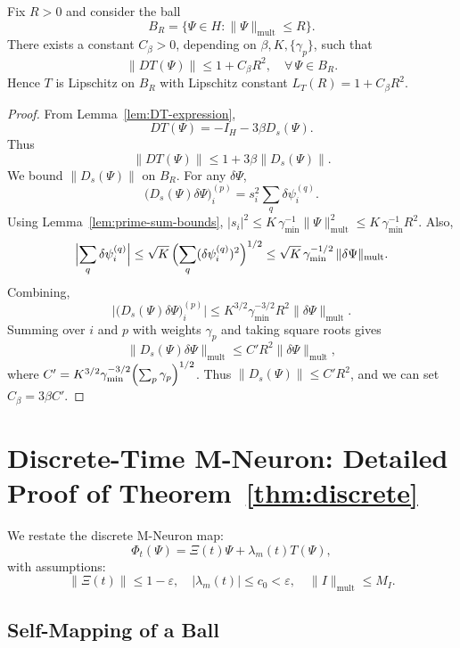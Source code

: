 \documentclass[11pt]{article}
\begin{document}
\begin{lemma}
\label{lem:T-Lipschitz}
Fix \(R>0\) and consider the ball
\[
B_R = \{\Psi\in H : \|\Psi\|_{\mathrm{mult}}\le R\}.
\]
There exists a constant \(C_\beta>0\), depending on \(\beta,K,\{\gamma_p\}\), such that
\begin{equation}
\label{eq:T-Lipschitz}
\|DT(\Psi)\| \le 1 + C_\beta R^2,
\quad
\forall\,\Psi\in B_R.
\end{equation}
Hence \(T\) is Lipschitz on \(B_R\) with Lipschitz constant
\(L_T(R) = 1 + C_\beta R^2\).
\end{lemma}

\begin{proof}
From Lemma~\ref{lem:DT-expression},
\[
DT(\Psi) = -I_H - 3\beta D_s(\Psi).
\]
Thus
\[
\|DT(\Psi)\| \le 1 + 3\beta \|D_s(\Psi)\|.
\]
We bound \(\|D_s(\Psi)\|\) on \(B_R\).
For any \(\delta\Psi\),
\[
\bigl(D_s(\Psi)\delta\Psi\bigr)_i^{(p)}
= s_i^2 \sum_{q} \delta\psi_i^{(q)}.
\]
Using Lemma~\ref{lem:prime-sum-bounds}, \(|s_i|^2 \le K\,\gamma_{\min}^{-1}\|\Psi\|_{\mathrm{mult}}^2 \le K\,\gamma_{\min}^{-1} R^2\).
Also,
\[
\Bigl|\sum_q \delta\psi_i^{(q)}\Bigr|
\le \sqrt{K}\,\Bigl(\sum_q (\delta\psi_i^{(q)})^2\Bigr)^{1/2}
\le \sqrt{K}\,\gamma_{\min}^{-1/2}\,\|\delta\Psi\|_{\mathrm{mult}}.
\]
Combining,
\[
\bigl|\bigl(D_s(\Psi)\delta\Psi\bigr)_i^{(p)}\bigr|
\le K^{3/2} \gamma_{\min}^{-3/2} R^2 \|\delta\Psi\|_{\mathrm{mult}}.
\]
Summing over \(i\) and \(p\) with weights \(\gamma_p\) and taking square roots gives
\[
\|D_s(\Psi)\delta\Psi\|_{\mathrm{mult}}
\le C' R^2 \|\delta\Psi\|_{\mathrm{mult}},
\]
where \(C' = K^{3/2}\gamma_{\min}^{-3/2}\Bigl(\sum_p \gamma_p\Bigr)^{1/2}\).
Thus \(\|D_s(\Psi)\|\le C' R^2\), and we can set \(C_\beta = 3\beta C'\).
\end{proof}

\section{Discrete-Time M-Neuron: Detailed Proof of Theorem~\ref{thm:discrete}}

We restate the discrete M-Neuron map:
\[
\Phi_t(\Psi) = \Xi(t)\Psi + \lambda_m(t)T(\Psi),
\]
with assumptions:
\[
\|\Xi(t)\|\le 1-\varepsilon,\quad
|\lambda_m(t)|\le c_0<\varepsilon,\quad
\|I\|_{\mathrm{mult}}\le M_I.
\]

\subsection{Self-Mapping of a Ball}
\end{document}
